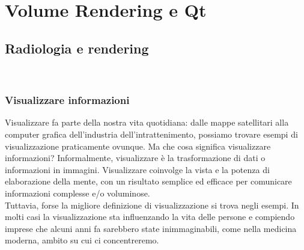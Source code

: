 
\chapter{Volume Rendering e Qt}
\label{cap:teoria-stage}

\section{Radiologia e rendering}
\\

\subsection{Visualizzare informazioni}\label{sec:visualizzare-informazioni}
Visualizzare fa parte della nostra vita quotidiana: dalle mappe satellitari alla computer grafica dell'industria dell'intrattenimento, possiamo trovare esempi di visualizzazione praticamente ovunque. Ma che cosa significa visualizzare informazioni? Informalmente, visualizzare è la trasformazione di dati o informazioni in immagini. Visualizzare coinvolge la vista e la potenza di elaborazione della mente, con un risultato semplice ed efficace per comunicare informazioni complesse e/o voluminose.
\\
Tuttavia, forse la migliore definizione di visualizzazione si trova negli esempi. In molti casi la visualizzazione sta influenzando la vita delle persone e compiendo imprese che alcuni anni fa sarebbero state inimmaginabili, come nella medicina moderna, ambito su cui ci concentreremo.

